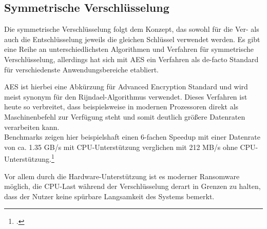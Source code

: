 \subsection{Symmetrische Verschlüsselung}
\label{sec:sym_verschl}

Die symmetrische Verschlüsselung folgt dem Konzept, das sowohl für die Ver- als auch die Entschlüsselung jeweils die gleichen Schlüssel verwendet werden.
Es gibt eine Reihe an unterschiedlichsten Algorithmen und Verfahren für symmetrische Verschlüsselung, allerdings hat sich mit \textsc{AES} ein Verfahren als de-facto Standard für verschiedenste Anwendungsbereiche etabliert.

AES ist hierbei eine Abkürzung für Advanced Encryption Standard und wird meist synonym für den Rijndael-Algorithmus verwendet. Dieses Verfahren ist heute so verbreitet, dass beispielsweise in modernen Prozessoren direkt als Maschinenbefehl zur Verfügung steht und somit deutlich größere Datenraten verarbeiten kann. \\
Benchmarks zeigen hier beispielshaft einen 6-fachen Speedup mit einer Datenrate von ca. 1.35 GB/s mit CPU-Unterstützung verglichen mit 212 MB/s ohne 
CPU-Unterstützung.\footcite{aes:benchmark}

Vor allem durch die Hardware-Unterstützung ist es moderner Ransomware möglich, die CPU-Last während der Verschlüsselung derart in Grenzen zu halten, dass der Nutzer keine spürbare Langsamkeit des Systems bemerkt. 


